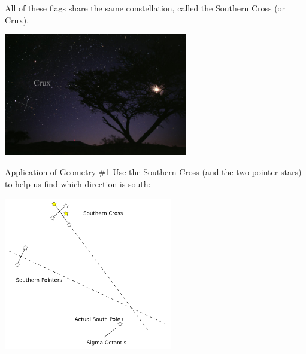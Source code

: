 \documentclass[compress,aspectratio=169,10pt,usenames,dvipsnames]{beamer}
\begin{document}
\begin{frame}

\vfill

All of these flags share the same constellation, called the Southern Cross (or Crux).

\vfill

\begin{center}
\includegraphics[width=0.6\textwidth]{Constellation_Crux} 
\end{center}

\vfill

\end{frame}


\begin{frame}

\vfill

\begin{block}{Application of Geometry \#1}
Use the Southern Cross (and the two pointer stars) to help us find which direction is south:
\end{block}

\begin{center}
\includegraphics[width=0.55\textwidth]{Navigate_South} 
\end{center}


\vfill


\end{frame}
\end{document}
